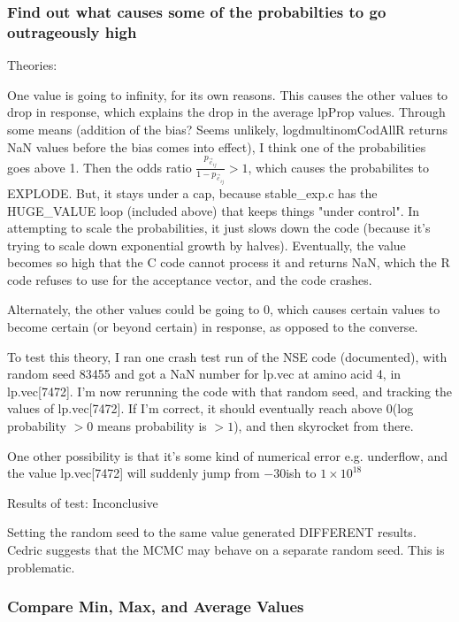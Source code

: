 \subsubsection{Find out what causes some of the probabilties to go outrageously high}

Theories:

One value is going to infinity, for its own reasons. This causes the other values to drop in response, which explains the drop in the average lpProp values. Through some means (addition of the bias? Seems unlikely, logdmultinomCodAllR returns NaN values before the bias comes into effect), I think one of the probabilities goes above 1. Then the odds ratio $\frac{p_{\vec{c}_{ij}}}{1 - p_{\vec{c}_{ij}}} > 1$, which causes the probabilites to EXPLODE. But, it stays under a cap, because stable\_exp.c has the HUGE\_VALUE loop (included above) that keeps things "under control". In attempting to scale the probabilities, it just slows down the code (because it's trying to scale down exponential growth by halves). Eventually, the value becomes so high that the C code cannot process it and returns NaN, which the R code refuses to use for the acceptance vector, and the code crashes.

Alternately, the other values could be going to 0, which causes certain values to become certain (or beyond certain) in response, as opposed to the converse. 

To test this theory, I ran one crash test run of the NSE code (documented), with random seed 83455 and got a NaN number for lp.vec at amino acid 4, in lp.vec[7472]. I'm now rerunning the code with that random seed, and tracking the values of lp.vec[7472]. If I'm correct, it should eventually reach above 0(log probability $> 0$ means probability is $> 1$), and then skyrocket from there.

One other possibility is that it's some kind of numerical error e.g. underflow, and the value lp.vec[7472] will suddenly jump from $-30$ish to $1\times10^{18}$

Results of test: Inconclusive

Setting the random seed to the same value generated DIFFERENT results. Cedric suggests that the MCMC may behave on a separate random seed. This is problematic.


\subsubsection{Compare Min, Max, and Average Values}

